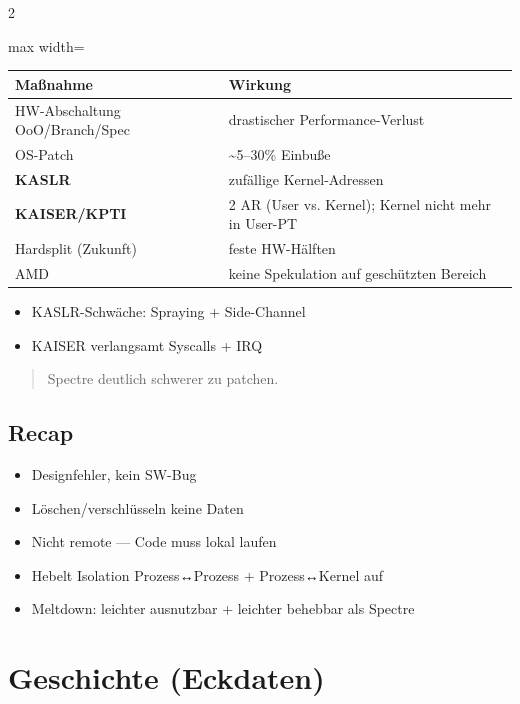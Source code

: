 \documentclass[10pt, a4paper]{article}
\begin{document}
\begin{multicols}{2}
{\small
\begin{adjustbox}{max width=\linewidth}
{\scriptsize
\begin{tabular}{ll}
\toprule
\textbf{Maßnahme} & \textbf{Wirkung} \\
\midrule
HW-Abschaltung OoO/Branch/Spec & drastischer Performance-Verlust \\
OS-Patch & \textasciitilde{}5–30\% Einbuße \\
\textbf{KASLR} & zufällige Kernel-Adressen \\
\textbf{KAISER/KPTI} & 2 AR (User vs. Kernel); Kernel nicht mehr in User-PT \\
Hardsplit (Zukunft) & feste HW-Hälften \\
AMD & keine Spekulation auf geschützten Bereich \\
\bottomrule
\end{tabular}
}
\end{adjustbox}
}


\begin{itemize}
  \item KASLR-Schwäche: Spraying + Side-Channel
  \item KAISER verlangsamt Syscalls + IRQ
\end{itemize}

\begin{quote}
Spectre deutlich schwerer zu patchen.
\end{quote}


\subsection{Recap}
\begin{itemize}
  \item Designfehler, kein SW-Bug
  \item Löschen/verschlüsseln keine Daten
  \item Nicht remote — Code muss lokal laufen
  \item Hebelt Isolation Prozess↔Prozess + Prozess↔Kernel auf
  \item Meltdown: leichter ausnutzbar + leichter behebbar als Spectre
\end{itemize}


\section{Geschichte (Eckdaten)}



\end{multicols}
\end{document}
